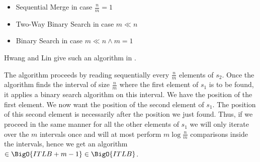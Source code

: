 \begin{itemize}
\item Sequential Merge in case $\frac{n}{m} = 1$
\item Two-Way Binary Search in case $m \ll n$
\item Binary Search in case $m \ll n \land m = 1$
\end{itemize}

Hwang and Lin give such an algorithm in \cite{DBLP:journals/siamcomp/HwangL72}.

The algorithm proceeds by reading sequentially every $\frac{n}{m}$ elements of $s_2$. Once the algorithm finds the interval of size $\frac{n}{m}$ where the first element of $s_1$ is to be found, it applies a binary search algorithm on this interval. We have the position of the first element.
We now want the position of the second element of $s_1$. The position of this second element is necessarily after the position we just found. Thus, if we proceed in the same manner for all the other elements of $s_1$ we will only iterate over the $m$ intervals once and will at most perform $m \log\frac{n}{m}$ comparisons inside the intervals, hence we get an algorithm $\in \BigO{ITLB + m - 1} \in \BigO{ITLB}$.

